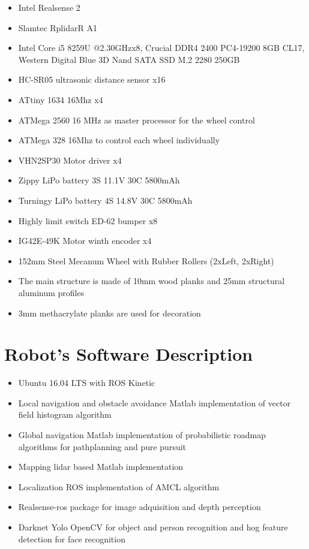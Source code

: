 \begin{itemize}[nosep]
	\item Intel Realsense 2
  \item Slamtec RplidarR A1 
  \item Intel Core i5 8259U @2.30GHzx8, Crucial DDR4 2400 PC4-19200 8GB CL17, Western Digital Blue 3D Nand SATA SSD M.2 2280 250GB
  \item HC-SR05 ultrasonic distance sensor x16
  \item ATtiny 1634 16Mhz x4
  \item ATMega 2560 16 MHz as master processor for the wheel control
  \item ATMega 328 16Mhz to control each wheel individually
  \item VHN2SP30 Motor driver x4
  \item Zippy LiPo battery 3S 11.1V 30C 5800mAh 
  \item Turningy LiPo battery 4S 14.8V 30C 5800mAh 
  \item Highly limit switch ED-62 bumper x8
  \item IG42E-49K Motor winth encoder x4
  \item 152mm Steel Mecanum Wheel with Rubber Rollers (2xLeft, 2xRight)
  \item The main structure is made of 10mm wood planks and 25mm structural aluminum profiles
  \item 3mm methacrylate planks are used for decoration
\end{itemize}

\section*{Robot's Software Description}

\begin{itemize}[nosep]
	\item Ubuntu 16.04 LTS with ROS Kinetic
  \item Local navigation and obstacle avoidance Matlab implementation of vector field histogram algorithm
  \item Global navigation Matlab implementation of probabilistic roadmap algorithms for pathplanning and pure pursuit
  \item Mapping lidar based Matlab implementation
  \item Localization ROS implementation of AMCL algorithm
  \item Realsense-ros package for image adquisition and depth perception
  \item Darknet Yolo OpenCV for object and person recognition and hog feature detection for face recognition
\end{itemize}


